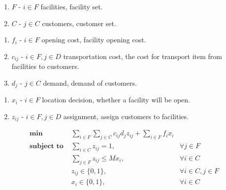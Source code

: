 \documentclass{elsarticle}
\begin{document}
\begin{enumerate}[(1)] \label{MODEL: sets}
\item {\(F\)} - {\(i \in F\)} {facilities}, facility set.
\item {\(C\)} - {\(j \in C\)} {customers}, customer set.
\end{enumerate}

\begin{enumerate}[(1)] \label{MODEL: parameters}
\item {\(f_i\)} - {\(i \in F\)} {opening cost}, facility opening cost.
\item {\(c_{ij}\)} - {\(i \in F, j \in D\)} {transportation cost}, the cost for transport item from facilities to customers.
\item {\(d_j\)} - {\(j \in C\)} {demand}, demand of customers.
\end{enumerate}

\begin{enumerate}[(1)] \label{MODEL: decisions}
\item {\(x_i\)} - {\(i \in F\)} {location decision}, whether a facility will be open.
\item {\(z_{ij}\)} - {\(i \in F, j \in D\)} {assignment}, assign customers to facilities.
\end{enumerate}

\begin{align}
\textbf{min~}
    \label{MODEL: OBJ - minimize}
        & \sum_{i \in F} \sum_{j \in C} c_{ij} d_j z_{ij} + \sum_{i \in F} f_i x_i \\  
\textbf{subject to~}
    \label{MODEL: CONS - link location and storage}
        & \sum_{i \in C} z_{ij} = 1, & \forall j \in F \\
    \label{}
        & \sum_{j \in F} z_{ij} \leq M x_i, & \forall i \in C \\
    \label{}
        & z_{ij} \in \{0, 1\}, & \forall i \in C, j \in F \\
    \label{}
        & x_i \in \{0, 1\}, & \forall i \in C
\end{align}
\end{document}
